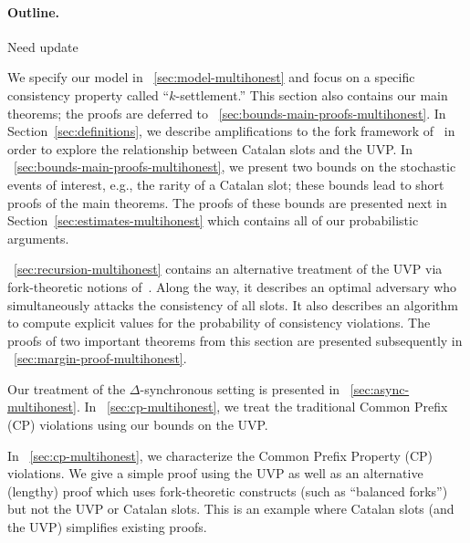 \paragraph{Outline.}
{\color{red} Need update}

We specify our model in \Section~\ref{sec:model-multihonest} and focus on a
specific consistency property called ``$k$-settlement.''  This section
also contains our main theorems; the proofs are deferred to
\Section~\ref{sec:bounds-main-proofs-multihonest}.  In
Section~\ref{sec:definitions}, we describe amplifications
to the fork framework of~\cite{LinearConsistency} in order to
explore the relationship between Catalan slots and the UVP. 
In \Section~\ref{sec:bounds-main-proofs-multihonest},
we present two bounds on the stochastic events of interest, e.g., the
rarity of a Catalan slot; these bounds lead to short proofs of the
main theorems.  The proofs of these bounds are presented next in
Section~\ref{sec:estimates-multihonest} which contains all of our probabilistic
arguments.  

\Section~\ref{sec:recursion-multihonest} contains an alternative treatment 
of the UVP via fork-theoretic notions of~\cite{LinearConsistency}. 
Along the way, it describes an optimal adversary who simultaneously attacks the consistency of all slots. 
It also describes an algorithm to compute explicit values 
for the probability of consistency violations. 
The proofs of two important theorems from this section 
are presented subsequently in \Section~\ref{sec:margin-proof-multihonest}.


Our treatment of the $\Delta$-synchronous setting is
presented in \Section~\ref{sec:async-multihonest}.  In \Section~\ref{sec:cp-multihonest}, we
treat the traditional Common Prefix (CP) violations using our bounds
on the UVP.  

In \Section~\ref{sec:cp-multihonest}, 
we characterize the Common Prefix Property (CP) violations. 
We give a simple proof using the UVP as well as 
an alternative (lengthy) proof which uses fork-theoretic constructs (such as ``balanced forks'') 
but not the UVP or Catalan slots. 
This is an example where Catalan slots (and the UVP) simplifies existing proofs.



